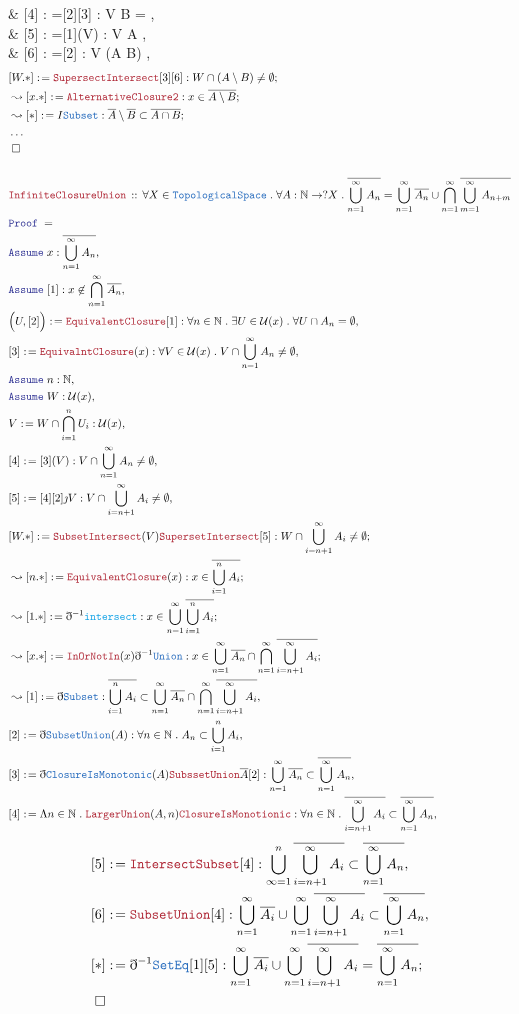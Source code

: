 \documentclass[12pt]{scrartcl}
\newcommand{\TYPE}[1]{\textcolor{NavyBlue}{\mathtt{#1}}}
\newcommand{\FUNC}[1]{\textcolor{Cerulean}{\mathtt{#1}}}
\newcommand{\LOGIC}[1]{\textcolor{Blue}{\mathtt{#1}}}
\newcommand{\THM}[1]{\textcolor{Maroon}{\mathtt{#1}}}
\renewcommand{\.}{\; . \;}
\newcommand{\de}{: \kern 0.1pc =}
\newcommand{\Theorem}[2]{& \THM{#1} \, :: \, #2 \\ & \Proof = \\ }
\newcommand{\Page}[1]{ \begin{align*} #1 \end{align*}   }
\newcommand{ \bd }{ \ByDef }
\newcommand{\NoProof}{ & \ldots \\ \EndProof}
\newcommand{\Nat}{\mathbb{N} }
\newcommand{\Say}[3]{& #1 \de #2 : #3, \\}
\newcommand{\Conclude}[3]{& #1 \de #2 : #3; \\}
\newcommand{\Derive}[3]{& \leadsto #1 \de #2 : #3, \\}
\newcommand{\DeriveConclude}[3]{& \leadsto #1 \de #2 : #3 ; \\}
\newcommand{\Assume}[2]{& \LOGIC{Assume} \; #1 : #2, \\}
\newcommand{\QED}{\; \square}
\newcommand{\EndProof}{& \QED \\}
\newcommand{\ByDef}{\eth}
\newcommand{\ByConstr}{\jmath}
\newcommand{\Proof}{\LOGIC{Proof} \; }
\newcommand{\TS}{\TYPE{TopologicalSpace}}
\renewcommand{\U}{\mathcal{U}}
\begin{document}
{	\Say{[4]}{[2][3]\THM{SubsetIntersect}}{V \cap B = \emptyset}
	\Say{[5]}{[1](V)}{V \cap A \neq \emptyset}
	\Say{[6]}{[2]}{ V \cap (A \setminus B) \neq \emptyset }
}\Page{	
	\Conclude{[W.*]}{\THM{SupersectIntersect}[3][6]}
	{ W \cap (A \setminus B) \neq \emptyset  }
	\DeriveConclude{[x.*]}{\THM{AlternativeClosure2}}
	{ x \in \overline{A\setminus B}}
	\DeriveConclude{[*]}{ I \TYPE{Subset} }
	{ 
		\overline{A} \setminus \overline{B} 
		\subset
		\overline{A \cap B}
	}
	\NoProof
	\\
	\Theorem{InfiniteClosureUnion}
	{
		\forall X \in \TS \.
		\forall A : \Nat \to ?X \.
		\overline{\bigcup^\infty_{n=1} A_n} = 
		\bigcup^{\infty}_{n=1} \overline{A_n} \cup 
		\bigcap^\infty_{n=1} \overline{\bigcup^\infty_{m=1} A_{n+m}} 
	}
	\Assume{x}{\overline{\bigcup^\infty_{n=1} A_n}} 
	\Assume{[1]}{x \not \in \bigcap^\infty_{n=1} \overline{A_n}}
	\Say{\Big( U,[2]\Big)}{\THM{EquivalentClosure}[1]}{
		\forall n \in \Nat \. 
		\exists U \in \U(x) \.
		\forall U \cap A_n = \emptyset
	}
	\Say{[3]}{\THM{EquivalntClosure}(x)}
	{
		\forall V \in \U(x) \.
		V \cap \bigcup^\infty_{n=1} A_n  \neq \emptyset	
	}
	\Assume{n}{\Nat}
	\Assume{W}{\U(x)}
	\Say{V}{W \cap \bigcap^n_{i=1} U_i}{\U(x)}
	\Say{[4]}{[3](V)}{V \cap \bigcup^\infty_{n=1} A_n \neq \emptyset}
	\Say{[5]}{[4][2]\ByConstr V}{ V \cap \bigcup^\infty_{i= n + 1 } A_i \neq \emptyset}
	\Conclude{[W.*]}{\THM{SubsetIntersect}(V)\THM{SupersetIntersect}[5]}
	{ W \cap \bigcup^\infty_{i = n + 1} A_i \neq \emptyset    } 
	\DeriveConclude{[n.*]}{ \THM{EquivalentClosure}(x) }
	{  x \in \overline{\bigcup^n_{i=1} A_i}    }
	\DeriveConclude{[1.*]}{ \bd^{-1} \FUNC{intersect} }
	{
		x \in \bigcup^\infty_{n=1} \overline{\bigcup^n_{i=1} A_i} 
	}
	\DeriveConclude{[x.*]}{\THM{InOrNotIn}(x)\bd^{-1} \TYPE{Union}}
	{
		x \in \bigcup^\infty_{n=1} \overline{A_n} 
		\cap
		\bigcap^\infty_{n=1} \overline{\bigcup_{i=n+1}^\infty A_i } 
	}
	\Derive{[1]}{\bd \TYPE{Subset} }
	{
		\overline{\bigcup^n_{i=1} A_i} \subset 
		\bigcup^\infty_{n=1} \overline{A_n} 
		\cap
		\bigcap^\infty_{n=1} \overline{\bigcup_{i=n+1}^\infty A_i } 
	}
	\Say{[2]}{\bd \TYPE{SubsetUnion}(A)}
	{
		\forall n \in \Nat \. A_n \subset \bigcup^n_{i=1} A_i
	}
	\Say{[3]}{\bd \TYPE{ClosureIsMonotonic}(A)\THM{SubssetUnion}{\overline{A}}[2] }
	{
		\bigcup^\infty_{n=1} \overline{A_n} \subset 
		\overline{\bigcup^\infty_{n=1} A_n}
	} 
	\Say{[4]}{\Lambda n \in \Nat \. \THM{LargerUnion}(A,n) \THM{ClosureIsMonotionic}}
	{
		\forall n \in \Nat \.
		\overline{\bigcup^\infty_{i=n+1} A_i} \subset
		\overline{\bigcup^\infty_{n=1} A_n}
	}
}\Page{ 
	\Say{[5]}{ \THM{IntersectSubset}[4]  } 
	{
		\bigcup^n_{\infty=1} 
		\overline{\bigcup^\infty_{i=n+1} A_i} \subset
		\overline{\bigcup^\infty_{n=1} A_n}	
	}
	\Say{[6]}{ \THM{SubsetUnion}[4]  } 
	{
		\bigcup^\infty_{n=1} \overline{A_i}
		\cup
		\bigcup^\infty_{n=1} 
		\overline{\bigcup^\infty_{i=n+1} A_i} \subset
		\overline{\bigcup^\infty_{n=1} A_n}	
	}
	\Conclude{[*]}
	{
		\bd^{-1} \TYPE{SetEq} [1][5]
	}
	{
		\bigcup^\infty_{n=1} \overline{A_i}
		\cup
		\bigcup^\infty_{n=1} 
		\overline{\bigcup^\infty_{i=n+1} A_i} =
		\overline{\bigcup^\infty_{n=1} A_n}	
	}
	\EndProof
}
\newpage
\end{document}
